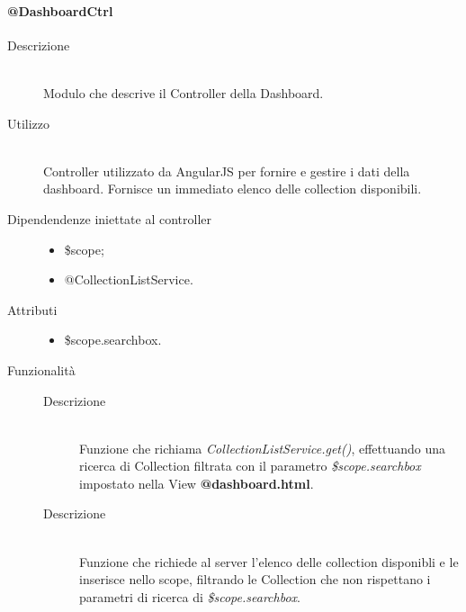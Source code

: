 \paragraph{@DashboardCtrl}
\begin{description}
 \item[Descrizione] \hfill \\
 Modulo che descrive il Controller della Dashboard.
 
 \item[Utilizzo] \hfill \\
 Controller utilizzato da AngularJS per fornire e gestire i dati della dashboard.
Fornisce un immediato elenco delle collection disponibili.
 
 \item[Dipendendenze iniettate al controller] \hfill
 \begin{itemize}
  \item \$scope;
  \item @CollectionListService.
 \end{itemize}
 
 \item[Attributi] \hfill
 \begin{itemize}
	 \item \$scope.searchbox.
 \end{itemize}
 
 \item[Funzionalità]
 \begin{mldescription}
  \begin{description}
  	\item[Descrizione] \hfill \\
  	Funzione che richiama \textit{CollectionListService.get()}, effettuando una ricerca di Collection filtrata con il parametro \textit{\$scope.searchbox} impostato nella View \textbf{@dashboard.html}.
  \end{description}
  
  \begin{description}
  	\item[Descrizione] \hfill \\
    Funzione che richiede al server l'elenco delle collection disponibli e le inserisce nello scope, filtrando le Collection che non rispettano i parametri di ricerca di \textit{\$scope.searchbox}.
  \end{description}
 \end{mldescription}
\end{description}

